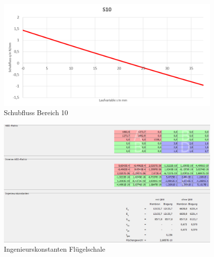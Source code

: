 \begin{figure}
	\includegraphics[width=1.0\textwidth]{Bilder/S10.png}
	\caption{Schubfluss Bereich 10}
	\label{fig:S10}
\end{figure}
\begin{figure}
	\includegraphics[width=1.0\textwidth]{Bilder/Konstanten Haut.png}
	\caption{Ingenieurskonstanten Flügelschale}
	\label{fig:Ingenieurskonstanten Haut}
\end{figure}
